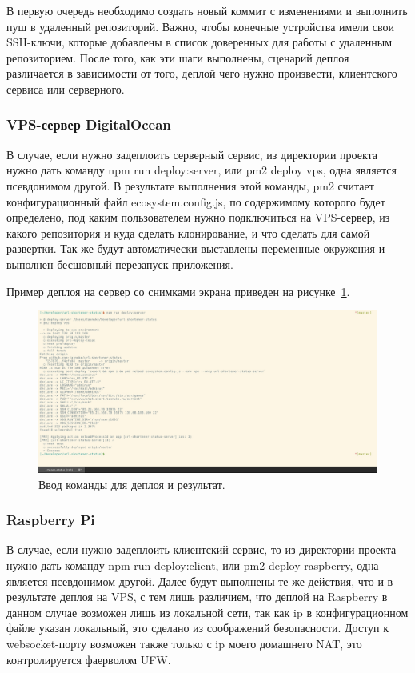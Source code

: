 \documentclass[a4paper, 12pt]{article}
\begin{document}
    В первую очередь необходимо создать новый коммит с изменениями и выполнить пуш в удаленный репозиторий. Важно, чтобы
    конечные устройства имели свои SSH-ключи, которые добавлены в список доверенных для работы с удаленным репозиторием.
    После того, как эти шаги выполнены, сценарий деплоя различается в зависимости от того, деплой чего нужно произвести,
    клиентского сервиса или серверного.

    \subsubsection*{VPS-сервер DigitalOcean}
    В случае, если нужно задеплоить серверный сервис, из директории проекта нужно дать команду npm run deploy:server, или
    pm2 deploy vps, одна является псевдонимом другой.
    В результате выполнения этой команды, pm2 считает конфигурационный файл ecosystem.config.js, по содержимому которого
    будет определено, под каким пользователем нужно подключиться на VPS-сервер, из какого репозитория и куда сделать
    клонирование, и что сделать для самой развертки. Так же будут автоматически выставлены переменные окружения и выполнен
    бесшовный перезапуск приложения.

    Пример деплоя на сервер со снимками экрана приведен на рисунке~\ref{fig:deploy}.

    \begin{figure}
        \includegraphics[width=\linewidth]{img/deploy.jpg}
        \caption{Ввод команды для деплоя и результат.}
        \label{fig:deploy}
    \end{figure}

    \subsubsection*{Raspberry Pi}
    В случае, если нужно задеплоить клиентский сервис, то из директории проекта нужно дать команду npm run deploy:client, или
    pm2 deploy raspberry, одна является псевдонимом другой. Далее будут выполнены те же действия, что и в результате
    деплоя на VPS, с тем лишь различием, что деплой на Raspberry в данном случае возможен лишь из локальной сети, так
    как ip в конфигурационном файле указан локальный, это сделано из соображений безопасности. Доступ к websocket-порту
    возможен также только с ip моего домашнего NAT, это контролируется фаерволом UFW.
\end{document}
